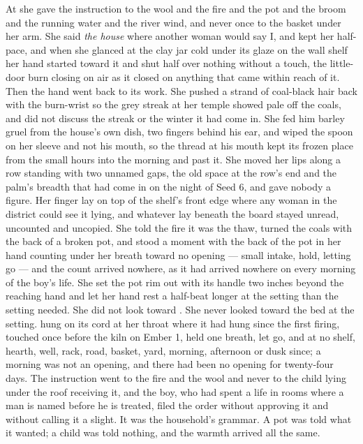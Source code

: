 \scenebreak

At  she gave the instruction to the wool and the fire and the pot and the broom and the running water and the river wind, and never once to the basket under her arm. She said \emph{the house} where another woman would say I, and kept her half-pace, and when she glanced at the clay jar cold under its glaze on the wall shelf her hand started toward it and shut half over nothing without a touch, the little-door burn closing on air as it closed on anything that came within reach of it. Then the hand went back to its work. She pushed a strand of coal-black hair back with the burn-wrist so the grey streak at her temple showed pale off the coals, and did not discuss the streak or the winter it had come in. She fed him barley gruel from the house's own dish, two fingers behind his ear, and wiped the spoon on her sleeve and not his mouth, so the thread at his mouth kept its frozen place from the small hours into the morning and past it. She moved her lips along a row standing with two unnamed gaps, the old space at the row's end and the palm's breadth that had come in on the night of Seed 6, and gave nobody a figure. Her finger lay on top of the shelf's front edge where any woman in the district could see it lying, and whatever lay beneath the board stayed unread, uncounted and uncopied. She told the fire it was the thaw, turned the coals with the back of a broken pot, and stood a moment with the back of the pot in her hand counting under her breath toward no opening --- small intake, hold, letting go --- and the count arrived nowhere, as it had arrived nowhere on every morning of the boy's life. She set the pot rim out with its handle two inches beyond the reaching hand and let her hand rest a half-beat longer at the setting than the setting needed. She did not look toward . She never looked toward the bed at the setting.  hung on its cord at her throat where it had hung since the first firing, touched once before the kiln on Ember 1, held one breath, let go, and at no shelf, hearth, well, rack, road, basket, yard, morning, afternoon or dusk since; a morning was not an opening, and there had been no opening for twenty-four days. The instruction went to the fire and the wool and never to the child lying under the roof receiving it, and the boy, who had spent a life in rooms where a man is named before he is treated, filed the order without approving it and without calling it a slight. It was the household's grammar. A pot was told what it wanted; a child was told nothing, and the warmth arrived all the same.

